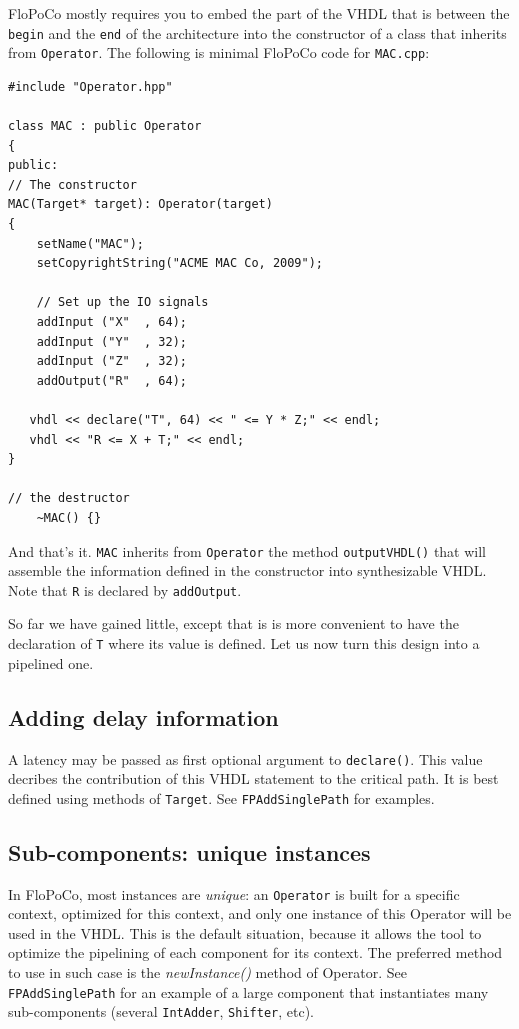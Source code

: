 \documentclass{article}
\begin{document}
FloPoCo mostly requires you to embed the part of the VHDL that is between the \texttt{begin} and the \texttt{end} of the architecture
into the constructor of a class that inherits from
\verb!Operator!. The following is minimal FloPoCo code for
\verb!MAC.cpp!:
\begin{verbatim}
#include "Operator.hpp"

class MAC : public Operator
{
public:
// The constructor
MAC(Target* target): Operator(target)
{
	setName("MAC");
	setCopyrightString("ACME MAC Co, 2009");		

	// Set up the IO signals
	addInput ("X"  , 64);
	addInput ("Y"  , 32);
	addInput ("Z"  , 32);
	addOutput("R"  , 64);

   vhdl << declare("T", 64) << " <= Y * Z;" << endl;
   vhdl << "R <= X + T;" << endl;
}

// the destructor
	~MAC() {}
\end{verbatim}
 
And that's it. \verb!MAC! inherits from \verb!Operator! the method
\verb!outputVHDL()! that will assemble the information defined in the
constructor into synthesizable VHDL. Note that \verb!R! is declared by \verb!addOutput!.

So far we have gained little, except that is is more convenient to
have the declaration of \verb!T! where its value is defined. Let us
now turn this design into a pipelined one.

\subsection{Adding delay information}
A latency  may be passed as first optional argument to  \texttt{declare()}.
  This value decribes the contribution of this VHDL statement to the critical path.
  It is best defined using methods of \texttt{Target}.
  See \texttt{FPAddSinglePath} for examples.

\subsection{Sub-components: unique instances}

In FloPoCo, most instances are \emph{unique}: an \texttt{Operator} is built for a specific context, optimized for this context, and only one instance of this Operator will be used in the VHDL.
This is the default situation, because it allows the tool to optimize the pipelining of each component for its context.
The preferred method to use in such case is the \emph{newInstance()} method of Operator. 
See \texttt{FPAddSinglePath} for an example of a large component that instantiates many sub-components (several \texttt{IntAdder}, \texttt{Shifter}, etc).
\end{document}
